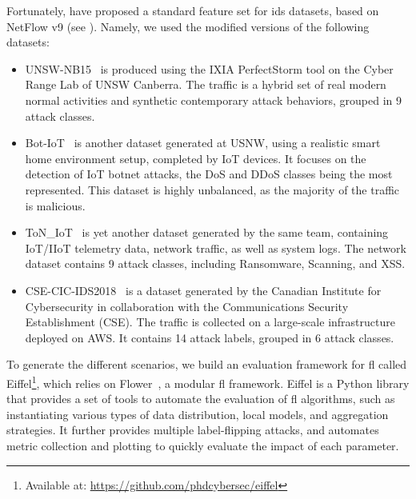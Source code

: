 Fortunately, \textcite{sarhan_StandardFeatureSet_2022} have proposed a standard feature set for \gls{ids} datasets, based on NetFlow v9 (see ).
Namely, we used the modified versions of the following datasets:
\begin{itemize}
    \item UNSW-NB15~\cite{moustafa_UNSWNB15comprehensivedata_2015} is produced using the IXIA PerfectStorm tool on the Cyber Range Lab of UNSW Canberra.
    The traffic is a hybrid set of real modern normal activities and synthetic contemporary attack behaviors, grouped in 9 attack classes.
    \item Bot-IoT~\cite{koroniotis_developmentrealisticbotnet_2019} is another dataset generated at USNW, using a realistic smart home environment setup, completed by IoT devices.
    It focuses on the detection of IoT botnet attacks, the DoS and DDoS classes being the most represented.
    This dataset is highly unbalanced, as the majority of the traffic is malicious.
    \item ToN\_IoT~\cite{moustafa_FederatedTON_IoTWindows_2020} is yet another dataset generated by the same team, containing IoT/IIoT telemetry data, network traffic, as well as system logs.
    The network dataset contains 9 attack classes, including Ransomware, Scanning, and XSS. %
    \item CSE-CIC-IDS2018~\cite{sharafaldin_GeneratingNewIntrusion_2018} is a dataset generated by the Canadian Institute for Cybersecurity in collaboration with the Communications Security Establishment (CSE).
    The traffic is collected on a large-scale infrastructure deployed on AWS.
    It contains 14 attack labels, grouped in 6 attack classes. %
\end{itemize}

To generate the different scenarios, we build an evaluation framework for \gls{fl} called Eiffel\footnote{Available at: \url{https://github.com/phdcybersec/eiffel}}, which relies on Flower~\cite{beutel_Flowerfriendlyfederated_2020}, a modular \gls{fl} framework. 
Eiffel is a Python library that provides a set of tools to automate the evaluation of \gls{fl} algorithms, such as instantiating various types of data distribution, local models, and aggregation strategies.
It further provides multiple label-flipping attacks, and automates metric collection and plotting to quickly evaluate the impact of each parameter.


